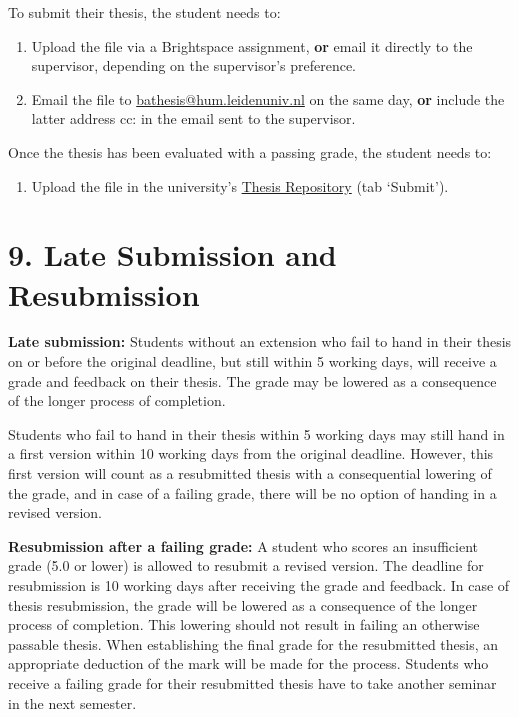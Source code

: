 \documentclass[11pt,a4paper]{article}
\begin{document}
To submit their thesis, the student needs to:
\begin{enumerate}
    \item Upload the file via a Brightspace assignment, \textbf{or} email it directly to the supervisor, depending on the supervisor's preference.
    \item Email the file to \href{mailto:bathesis@hum.leidenuniv.nl}{bathesis@hum.leidenuniv.nl} on the same day, \textbf{or} include the latter address cc: in the email sent to the supervisor.
\end{enumerate}

Once the thesis has been evaluated with a passing grade, the student needs to:
\begin{enumerate}[resume]
    \item Upload the file in the university's \href{https://studenttheses.universiteitleiden.nl/}{Thesis Repository} (tab `Submit').
\end{enumerate}

\section{9. Late Submission and Resubmission}

\textbf{Late submission:} Students without an extension who fail to hand in their thesis on or before the original deadline, but still within 5 working days, will receive a grade and feedback on their thesis. The grade may be lowered as a consequence of the longer process of completion.

Students who fail to hand in their thesis within 5 working days may still hand in a first version within 10 working days from the original deadline. However, this first version will count as a resubmitted thesis with a consequential lowering of the grade, and in case of a failing grade, there will be no option of handing in a revised version.

\textbf{Resubmission after a failing grade:} A student who scores an insufficient grade (5.0 or lower) is allowed to resubmit a revised version. The deadline for resubmission is 10 working days after receiving the grade and feedback. In case of thesis resubmission, the grade will be lowered as a consequence of the longer process of completion. This lowering should not result in failing an otherwise passable thesis. When establishing the final grade for the resubmitted thesis, an appropriate deduction of the mark will be made for the process. Students who receive a failing grade for their resubmitted thesis have to take another seminar in the next semester.
\end{document}
